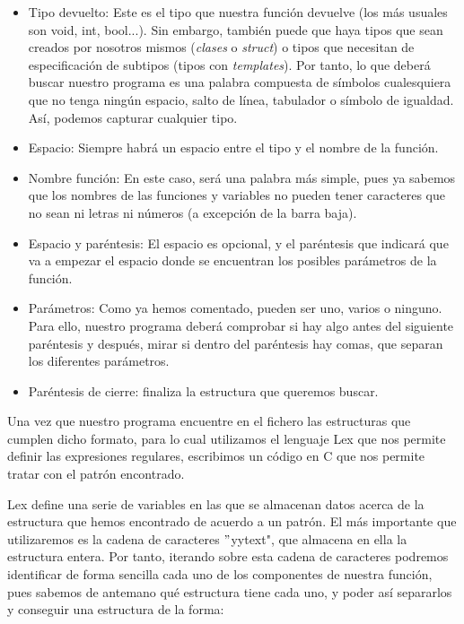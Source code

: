 \documentclass[11pt]{article}
\begin{document}
\begin{itemize}
	\item Tipo devuelto: Este es el tipo que nuestra función devuelve (los más usuales son void, int, bool...). Sin embargo, también puede que haya tipos que sean creados por nosotros mismos (\textit{clases} o \textit{struct}) o tipos que necesitan de especificación de subtipos (tipos con \textit{templates}). Por tanto, lo que deberá buscar nuestro programa es una palabra compuesta de símbolos cualesquiera que no tenga ningún espacio, salto de línea, tabulador o símbolo de igualdad. Así, podemos capturar cualquier tipo.
	
	\item Espacio: Siempre habrá un espacio entre el tipo y el nombre de la función.
	
	\item Nombre función: En este caso, será una palabra más simple, pues ya sabemos que los nombres de las funciones y variables no pueden tener caracteres que no sean ni letras ni números (a excepción de la barra baja).
	
	\item Espacio y paréntesis: El espacio es opcional, y el paréntesis que indicará que va a empezar el espacio donde se encuentran los posibles parámetros de la función.
	
	\item Parámetros: Como ya hemos comentado, pueden ser uno, varios o ninguno. Para ello, nuestro programa deberá comprobar si hay algo antes del siguiente paréntesis y después, mirar si dentro del paréntesis hay comas, que separan los diferentes parámetros.
	
	\item Paréntesis de cierre: finaliza la estructura que queremos buscar.

\end{itemize}


Una vez que nuestro programa encuentre en el fichero las estructuras que cumplen dicho formato, para lo cual utilizamos el lenguaje Lex que nos permite definir las expresiones regulares, escribimos un código en C que nos permite tratar con el patrón encontrado.

Lex define una serie de variables en las que se almacenan datos acerca de la estructura que hemos encontrado de acuerdo a un patrón. El más importante que utilizaremos es la cadena de caracteres $"$yytext", que almacena en ella la estructura entera. Por tanto, iterando sobre esta cadena de caracteres podremos identificar de forma sencilla cada uno de los componentes de nuestra función, pues sabemos de antemano qué estructura tiene cada uno, y poder así separarlos y conseguir una estructura de la forma:\\
\end{document}
